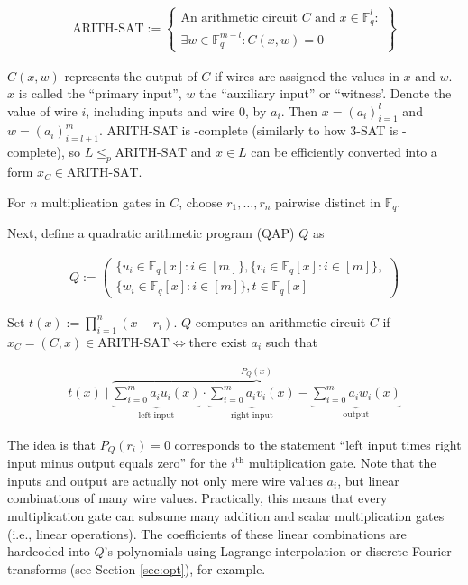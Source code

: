 \documentclass{article}
\begin{document}
\begin{align*}
        \text{ARITH-SAT} := \left\{\begin{aligned}\text{An arithmetic circuit } C \text{ and } x \in \mathbb{F}_q^l \colon \\
        \exists w \in \mathbb{F}_q^{m-l}\colon C(x,w) = 0\end{aligned}\right\}
\end{align*}

$C(x,w)$ represents the output of $C$ if wires are assigned the values in $x$ and $w$.
$x$ is called the ``primary input'', $w$ the ``auxiliary input'' or ``witness'.
Denote the value of wire $i$, including inputs and wire $0$, by $a_i$.
Then $x = (a_i)_{i=1}^l$ and $w = (a_i)_{i=l+1}^m$.
ARITH-SAT is \NP-complete (similarly to how 3-SAT is \NP-complete), so $L \leq_p \text{ARITH-SAT}$ and $x \in L$ can be efficiently converted into a form $x_C \in \text{ARITH-SAT}$.

For $n$ multiplication gates in $C$, choose $r_1, \ldots, r_n$ pairwise distinct in $\mathbb{F}_q$.

Next, define a quadratic arithmetic program (QAP) $Q$ as

\begin{align*}
        Q := \left(\begin{aligned}\{u_i \in \mathbb{F}_q[x] \colon i \in [m]\},\{v_i \in \mathbb{F}_q[x] \colon i \in [m]\},\\
        \{w_i \in \mathbb{F}_q[x] \colon i \in [m]\}, t \in \mathbb{F}_q[x]\end{aligned}\right)
\end{align*}

Set $t(x) := \prod_{i=1}^n(x-r_i)$.
$Q$ computes an arithmetic circuit $C$ if $x_C = (C,x) \in \text{ARITH-SAT} \iff \text{there exist } a_i$ such that

\begin{align*}
        t(x) \mid \overbrace{\underbrace{\sum_{i=0}^m a_iu_i(x)}_\text{left input} \cdot \underbrace{\sum_{i=0}^m a_iv_i(x)}_\text{right input} - \underbrace{\sum_{i=0}^{m} a_iw_i(x)}_\text{output}}^\text{$P_Q(x)$}
\end{align*}

The idea is that $P_Q(r_i) = 0$ corresponds to the statement ``left input times right input minus output equals zero'' for the $i^\text{th}$ multiplication gate.
Note that the inputs and output are actually not only mere wire values $a_i$, but linear combinations of many wire values.
Practically, this means that every multiplication gate can subsume many addition and scalar multiplication gates (i.e., linear operations).
The coefficients of these linear combinations are hardcoded into $Q$'s polynomials using Lagrange interpolation or discrete Fourier transforms (see Section \ref{sec:opt}), for example.
\end{document}
